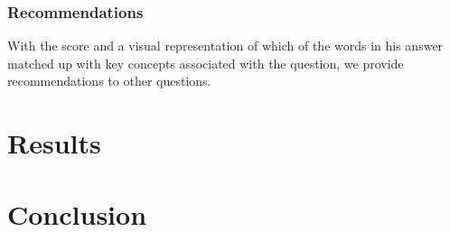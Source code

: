 \documentclass[11pt,a4paper]{article}
\begin{document}
\subsubsection{Recommendations}
With the score and a visual representation of which of the words in his answer matched up with key concepts associated with the question, we provide recommendations to other questions. 

\section{Results}

\section{Conclusion}

\end{document}
